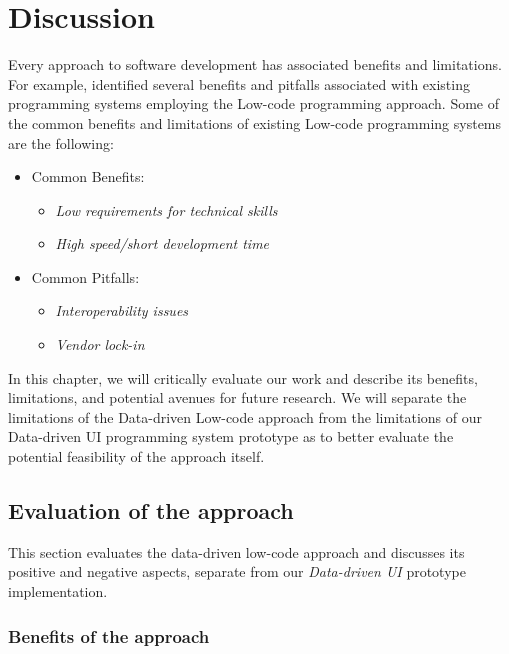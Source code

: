 \chapter{Discussion}
\label{chap:discussion}

Every approach to software development has associated benefits and limitations.
For example, \citet{Pinho_Aguiar_Amaral_2023} identified several benefits and pitfalls associated with existing programming systems employing the Low-code programming approach.
Some of the common benefits and limitations of existing Low-code programming systems are the following:
\begin{itemize}
	\item Common Benefits:
	      \begin{itemize}
		      \item \emph{Low requirements for technical skills}
		      \item \emph{High speed/short development time}
	      \end{itemize}

	\item Common Pitfalls:
	      \begin{itemize}
		      \item \emph{Interoperability issues}
		      \item \emph{Vendor lock-in}
	      \end{itemize}
\end{itemize}

In this chapter, we will critically evaluate our work and describe its benefits, limitations, and potential avenues for future research.
We will separate the limitations of the Data-driven Low-code approach from the limitations of our Data-driven UI programming system prototype as to
better evaluate the potential feasibility of the approach itself.

\section{Evaluation of the approach}
This section evaluates the data-driven low-code approach and discusses its positive and negative aspects, separate from our \emph{Data-driven UI} prototype implementation.

\subsection{Benefits of the approach}

